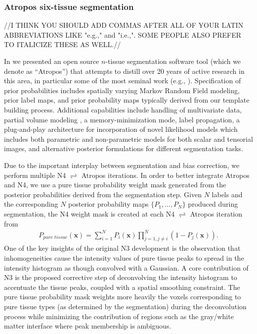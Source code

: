 \subsubsection{Atropos six-tissue segmentation}

//I THINK YOU SHOULD ADD COMMAS AFTER ALL OF YOUR LATIN ABBREVIATIONS LIKE "e.g.," and "i.e.,".
SOME PEOPLE ALSO PREFER TO ITALICIZE THESE AS WELL.//

In \cite{avants2011a} we presented an open source $n$-tissue segmentation software tool
(which we denote as ``Atropos'') that attempts to distill over 20 years of active research in this area,
in particular some of the most seminal work (e.g., \cite{zhang2001,ashburner2005}).
Specification of prior probabilities includes spatially varying Markov Random Field modeling, 
prior label maps, and prior probability maps typically derived from our template building 
process.  Additional
capabilities include handling of multivariate data, 
partial volume modeling \citep{shattuck2001}, a memory-minimization mode,
label propagation, a plug-and-play architecture for incorporation of novel likelihood models
which includes both parametric and non-parametric models for both scalar and tensorial
images, and alternative posterior formulations for different segmentation tasks.

Due to the important interplay between segmentation and bias correction,
we perform multiple N4 $\rightleftharpoons$ Atropos iterations.
In order to better integrate Atropos and N4, we use  
a pure tissue probability weight mask generated from the 
posterior probabilities derived from the segmentation 
step.  Given $N$ labels and the corresponding $N$
posterior probability maps $\{ P_1, \ldots, P_N\}$ produced
during segmentation, the N4 weight mask is 
created at each N4 $\rightleftharpoons$ Atropos iteration from
\begin{align}
  P_{pure\,\,tissue}(\mathbf{x}) = \sum_{i=1}^N P_i(\mathbf{x}) \prod_{j=1, j \neq i}^N \left( 1 - P_j(\mathbf{x}) \right).
\end{align}
One of the key insights of the original N3 development is the
observation that inhomogeneities cause the intensity values of
pure tissue peaks to spread in the intensity histogram as though
convolved with a Gaussian.  A core contribution of N3 is the
proposed corrective step of deconvolving the intensity histogram to
accentuate the tissue peaks, coupled with a spatial smoothing
constraint. The pure tissue probability mask
weights more heavily the voxels corresponding to pure tissue 
types (as determined by the segmentation) during the deconvolution process 
while minimizing the contribution of regions such as the gray/white matter 
interface where peak membership is ambiguous. 

